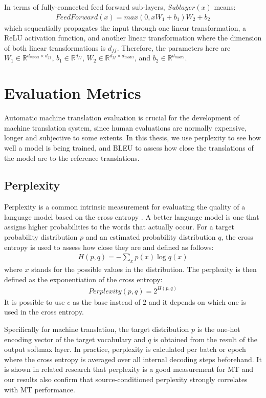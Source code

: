 In terms of fully-connected feed forward sub-layers, $ Sublayer(x) $ means:
\begin{align*}
FeedForward(x) = max(0,xW_{1}+b_{1})W_{2}+b_{2}
\end{align*}
which sequentially propagates the input through one linear transformation, a ReLU activation function, and another linear transformation where the dimension of both linear transformations is $ d_{ff} $. Therefore, the parameters here are $ W_{1} \in \mathbb{R}^{d_{model} \times d_{ff}} $, $ b_{1} \in \mathbb{R}^{d_{ff}} $, $ W_{2} \in \mathbb{R}^{d_{ff} \times d_{model}} $, and $ b_{2} \in \mathbb{R}^{d_{model}} $.

\section{Evaluation Metrics}

Automatic machine translation evaluation is crucial for the development of machine translation system, since human evaluations are normally expensive, longer and subjective to some extents. In this thesis, we use perplexity to see how well a model is being trained, and BLEU to assess how close the translations of the model are to the reference translations.

\subsection{Perplexity}

Perplexity is a common intrinsic measurement for evaluating the quality of a language model based on the cross entropy \cite{koehn2009statistical}. A better language model is one that assigns higher probabilities to the words that actually occur. For a target probability distribution $ p $ and an estimated probability distribution $ q $, the cross entropy is used to assess how close they are and defined as follows:
\begin{align*}
H(p,q) = - \sum_{x} p(x) \log q(x)
\end{align*}
where $ x $ stands for the possible values in the distribution. The perplexity is then defined as the exponentiation of the cross entropy:
\begin{align*}
Perplexity(p,q) = 2^{H(p,q)}
\end{align*}
It is possible to use $ e $ as the base instead of $ 2 $ and it depends on which one is used in the cross entropy.

Specifically for machine translation, the target distribution $ p $ is the one-hot encoding vector of the target vocabulary and $ q $ is obtained from the result of the output softmax layer. In practice, perplexity is calculated per batch or epoch where the cross entropy is averaged over all internal decoding steps beforehand. It is shown in related research \cite{luong2015deep,Wu2016} that perplexity is a good measurement for MT and our results also confirm that source-conditioned perplexity strongly correlates with MT performance.

